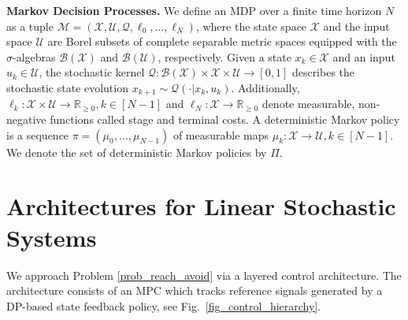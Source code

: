 \documentclass{IEEEtran}
\begin{document}
\textbf{Markov Decision Processes.}
We define an MDP over a finite time horizon $N$ as a tuple $\mathcal{M}=(\mathcal{X}, \mathcal{U}, \mathcal{Q}, \ell_{0},\dots,\ell_{N})$, where the state space $\mathcal{X}$ and the input space $\mathcal{U}$ are Borel subsets of complete separable metric spaces equipped with the $\sigma$-algebras $\mathcal{B}(\mathcal{X})$ and $\mathcal{B}(\mathcal{U})$, respectively. Given a state $x_k\!\in\!\mathcal{X}$ and an input $u_k\!\in\!\mathcal{U}$, the stochastic kernel $\mathcal{Q}\!:\!\mathcal{B}(\mathcal{X})\!\times\!\mathcal{X}\!\times\!\mathcal{U}\!\rightarrow\![0,1]$ describes the stochastic state evolution $x_{k+1}\sim \mathcal{Q}(\cdot|x_k,u_k)$.
Additionally, $\ell_k\!:\!\mathcal{X}\!\times\mathcal{U}\!\rightarrow\!\mathbb{R}_{\geq 0}, k\in[N-1]$ and $\ell_N\!:\!\mathcal{X}\!\rightarrow\!\mathbb{R}_{\geq 0}$ denote measurable, non-negative functions called stage and terminal costs. A deterministic Markov policy is a sequence $\pi=(\mu_0,\dots,\mu_{N-1})$ of measurable maps $\mu_k\!:\!\mathcal{X}\!\rightarrow\!\mathcal{U}, k\in [N-1]$. We denote the set of deterministic Markov policies by $\Pi$. 


\section{Architectures for Linear Stochastic Systems}
\label{sec_hierarchy}
We approach Problem \ref{prob_reach_avoid} via a layered control architecture. The architecture consists of an MPC which tracks reference signals generated by a DP-based state feedback policy, see Fig.~\ref{fig_control_hierarchy}. 
\end{document}
